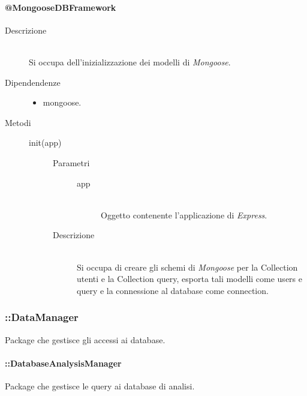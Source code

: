 \paragraph{@MongooseDBFramework}
\begin{description}
 \item[Descrizione] \hfill \\
 Si occupa dell'inizializzazione dei modelli di \textit{Mongoose}.
  \item[Dipendendenze] \hfill
  \begin{itemize}
  \item mongoose.
  \end{itemize}
\item[Metodi] \hfill
 \begin{description}
 \item[init(app)] \hfill 
\begin{description}
     		\item[Parametri] \hfill
     			\begin{description}
     				\item[app] \hfill \\
     				Oggetto contenente l'applicazione di \textit{Express}.
     			\end{description}
     		\item[Descrizione] \hfill \\
     		  Si occupa di creare gli schemi di \textit{Mongoose} per la Collection utenti e la Collection query, esporta tali modelli come users e query e la connessione al database come connection.
     	\end{description}
 \end{description}
\end{description}

\subsubsection{::DataManager}
Package che gestisce gli accessi ai database.

\paragraph{::DatabaseAnalysisManager} \hfill 
Package che gestisce le query ai database di analisi. 

